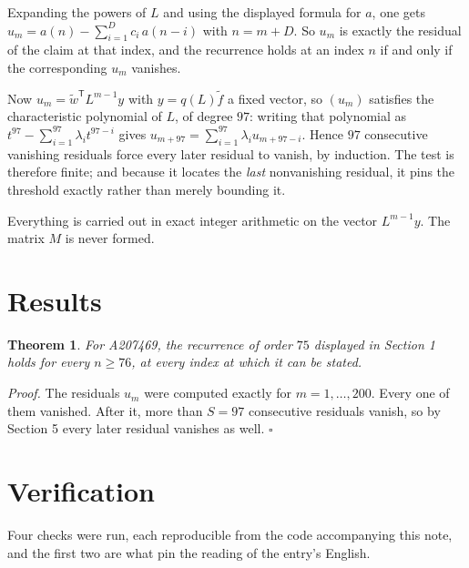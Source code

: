 \documentclass[11pt]{article}
\newtheorem{theorem}{Theorem}
\theoremstyle{definition}
\begin{document}
Expanding the powers of $L$ and using the displayed formula for $a$, one gets $u_m = a(n) - \sum_{i=1}^{D} c_i\,a(n-i)$ with $n = m + D$. So $u_m$ is exactly the residual of the claim at that index, and the recurrence holds at an index $n$ if and only if the corresponding $u_m$ vanishes.

Now $u_m = \tilde w^{\mathsf T} L^{m-1} y$ with $y = q(L)\tilde f$ a fixed vector, so $(u_m)$ satisfies the characteristic polynomial of $L$, of degree $97$: writing that polynomial as $t^{97} - \sum_{i=1}^{97} \lambda_i t^{97-i}$ gives $u_{m+97} = \sum_{i=1}^{97} \lambda_i u_{m+97-i}$. Hence $97$ consecutive vanishing residuals force every later residual to vanish, by induction. The test is therefore finite; and because it locates the {\itshape last} nonvanishing residual, it pins the threshold exactly rather than merely bounding it.

Everything is carried out in exact integer arithmetic on the vector $L^{m-1}y$. The matrix $M$ is never formed.

\section{Results}

\begin{theorem} For A207469, the recurrence of order $75$ displayed in Section 1 holds for every $n \ge 76$, at every index at which it can be stated.\end{theorem}

{\itshape Proof.} The residuals $u_m$ were computed exactly for $m = 1,\dots,200$. Every one of them vanished. After it, more than $S = 97$ consecutive residuals vanish, so by Section 5 every later residual vanishes as well. $\square$

\section{Verification}

Four checks were run, each reproducible from the code accompanying this note, and the first two are what pin the reading of the entry's English.
\end{document}
